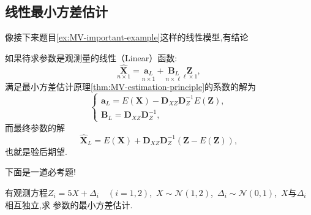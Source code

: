 \documentclass[cn,10pt,citestyle=gb7714-2015,bibstyle=gb7714-2015]{elegantbook}
\renewcommand{\l}{\ell}
\begin{document}
\subsection{线性最小方差估计}
像接下来题目\ref{ex:MV-important-example}这样的线性模型,有结论
\begin{theorem}[线性最小方差估计的系数的解]\label{thm:linear-MV-solution}
  如果待求参数是观测量的线性（Linear）函数:
  \[
      \underset{n\times 1}{\hat{\bm{X}}}=\underset{n\times 1}{\bm{a}_L}+\underset{n\times\l}{\bm{B}_L}\underset{\l\times 1}{\bm{Z}},
  \]
  满足最小方差估计原理\ref{thm:MV-estimation-principle}的系数的解为
  \begin{equation}
    \begin{cases}
      \bm{a}_L=E(\bm{X})-\bm{D}_{XZ}\bm{D}_{Z}^{-1}E(\bm{Z}),\\
      \bm{B}_L=\bm{D}_{XZ}\bm{D}_Z^{-1},
    \end{cases}
  \end{equation}
  而最终参数的解
  \begin{equation}
    \hat{\bm{X}}_{L}=E(\bm{X})+\bm{D}_{XZ}\bm{D}_Z^{-1}(\bm{Z}-E(\bm{Z})),
  \end{equation}
  也就是验后期望.
\end{theorem}
\begin{note}
  下面是一道必考题!
\end{note}
\begin{example}\label{ex:MV-important-example}
  有观测方程$Z_i=5X+\varDelta_i\quad (i=1,2)$,\ $X\sim \mathcal{N}(1,2)$,\ $\varDelta_i\sim \mathcal{N}(0,1)$,\ $X$与$\varDelta_i$相互独立,求
  参数的最小方差估计.
\end{example}
\end{document}
